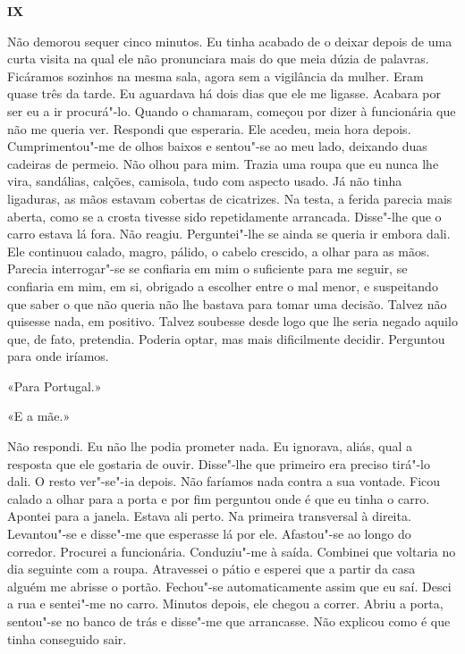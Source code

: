 \vspace*{1.8cm}
\noindent{}\textbf{IX}

\bigskip

Não demorou sequer cinco minutos. Eu tinha acabado de o deixar depois de
uma curta visita na qual ele não pronunciara mais do que meia dúzia de
palavras. Ficáramos sozinhos na mesma sala, agora sem a vigilância da
mulher. Eram quase três da tarde. Eu aguardava há dois dias que ele me
ligasse. Acabara por ser eu a ir procurá"-lo. Quando o chamaram, começou
por dizer à funcionária que não me queria ver. Respondi que esperaria.
Ele acedeu, meia hora depois. Cumprimentou"-me de olhos baixos e
sentou"-se ao meu lado, deixando duas cadeiras de permeio. Não olhou
para mim. Trazia uma roupa que eu nunca lhe vira, sandálias, calções,
camisola, tudo com aspecto usado. Já não tinha ligaduras, as mãos
estavam cobertas de cicatrizes. Na testa, a ferida parecia mais aberta,
como se a crosta tivesse sido repetidamente arrancada. Disse"-lhe que o
carro estava lá fora. Não reagiu. Perguntei"-lhe se ainda se queria ir
embora dali. Ele continuou calado, magro, pálido, o cabelo crescido, a
olhar para as mãos. Parecia interrogar"-se se confiaria em mim o
suficiente para me seguir, se confiaria em mim, em si, obrigado a
escolher entre o mal menor, e suspeitando que saber o que não queria não
lhe bastava para tomar uma decisão. Talvez não quisesse nada, em
positivo. Talvez soubesse desde logo que lhe seria negado aquilo que, de
fato, pretendia. Poderia optar, mas mais dificilmente decidir.
Perguntou para onde iríamos.

«Para Portugal.»

«E a mãe.»

Não respondi. Eu não lhe podia prometer nada. Eu ignorava, aliás, qual a
resposta que ele gostaria de ouvir. Disse"-lhe que primeiro era preciso
tirá"-lo dali. O resto ver"-se"-ia depois. Não faríamos nada contra a
sua vontade. Ficou calado a olhar para a porta e por fim perguntou onde
é que eu tinha o carro. Apontei para a janela. Estava ali perto. Na
primeira transversal à direita. Levantou"-se e disse"-me que esperasse
lá por ele. Afastou"-se ao longo do corredor. Procurei a funcionária.
Conduziu"-me à saída. Combinei que voltaria no dia seguinte com a roupa.
Atravessei o pátio e esperei que a partir da casa alguém me abrisse o
portão. Fechou"-se automaticamente assim que eu saí. Desci a rua e
sentei"-me no carro. Minutos depois, ele chegou a correr. Abriu a porta,
sentou"-se no banco de trás e disse"-me que arrancasse. Não explicou
como é que tinha conseguido sair.

